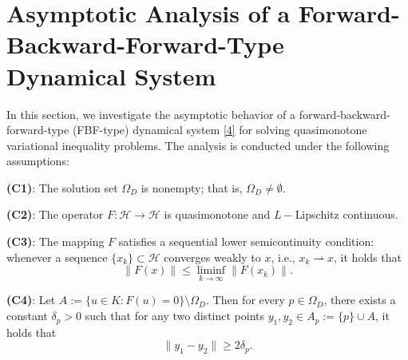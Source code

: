 \documentclass[hidelinks,11 pt]{article}
\numberwithin{equation}{section}
\theoremstyle{definition}  %
\numberwithin{equation}{section}
\numberwithin{theorem}{section}
\begin{document}
\section{Asymptotic Analysis of a Forward-Backward-Forward-Type Dynamical System}\label{sec:dynsys}

\quad In this section, we investigate the asymptotic behavior of a forward-backward-forward-type (FBF-type) dynamical system \eqref{4} for solving quasimonotone variational inequality problems. 
 \vskip 2mm 
The analysis is conducted under the following assumptions:

\vskip 2mm
\textbf{(C1)}: The solution set \( \Omega_{D} \) is nonempty; that is, \( \Omega_{D} \neq \emptyset \).

\vskip 2mm
\textbf{(C2)}: The operator \( F:\mathcal{H} \to \mathcal{H} \) is quasimonotone and $L-$Lipschitz continuous.

\vskip 2mm
\textbf{(C3)}: The mapping \( F \) satisfies a sequential lower semicontinuity condition: whenever a sequence \( \{x_k\} \subset \mathcal{H} \) converges weakly to \( x \), i.e., \( x_k \rightharpoonup x \), it holds that
\[
\|F(x)\| \leq \liminf_{k \to \infty} \|F(x_k)\|.
\]

\vskip 2mm
\textbf{(C4)}: Let \( A := \{u \in K : F(u) = 0\} \setminus \Omega_D \). Then for every \( p \in \Omega_D \), there exists a constant \( \delta_p > 0 \) such that for any two distinct points \( y_1, y_2 \in A_p := \{p\} \cup A \), it holds that
\[
\|y_1 - y_2\| \geq 2\delta_p.
\]
\end{document}
